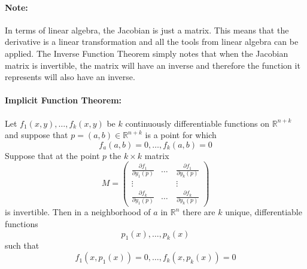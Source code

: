 \documentclass[10pt,a4paper]{article}
\begin{document}
\paragraph{Note:} In terms of linear algebra, the Jacobian is just a matrix. This means that the derivative is a linear transformation and all the tools from linear algebra can be applied. The Inverse Function Theorem simply notes that when the Jacobian matrix is invertible, the matrix will have an inverse and therefore the function it represents will also have an inverse.

\paragraph{Implicit Function Theorem:} Let $f_1(x,y), \dots, f_k(x,y)$ be $k$ continuously differentiable functions on $\mathbb{R}^{n+k}$ and suppose that $p = (a,b) \in \mathbb{R}^{n+k}$ is a point for which
$$ f_a(a,b) = 0, \dots, f_k(a,b) = 0$$
Suppose that at the point $p$ the $k \times k$ matrix
$$ M = 
\begin{pmatrix}
\frac{\partial f_1}{\partial y_1(p)} & \dots & \frac{\partial f_1}{\partial y_k(p)}\\
\vdots & \quad & \vdots\\
\frac{\partial f_k}{\partial y_1(p)} & \dots & \frac{\partial f_k}{\partial y_k(p)}
\end{pmatrix}$$
is invertible. Then in a neighborhood of $a$ in $\mathbb{R}^n$ there are $k$ unique, differentiable functions
$$p_1(x), \dots, p_k(x)$$
such that
$$ f_1(x,p_1(x))=0, \dots, f_k(x,p_k(x)) = 0$$
\end{document}
